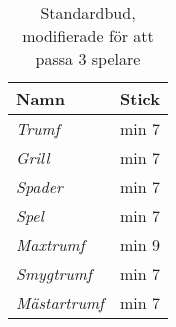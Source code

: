 %
%
%
%

\begin{table}
	\caption{Standardbud, modifierade för att passa $3$ spelare}\label{tab:standardBids3}
	\begin{center}
		\begin{tabular}{l|c}
			\textbf{Namn} & \textbf{Stick}
			\\ \hline
			\textit{Trumf} & min 7 \\
			\textit{Grill} & min 7 \\
			\textit{Spader} & min 7 \\
			\textit{Spel} & min 7 \\
			\textit{Maxtrumf} & min 9 \\
			\textit{Smygtrumf} & min 7 \\
			\textit{Mästartrumf} & min 7
		\end{tabular}
	\end{center}
\end{table}
